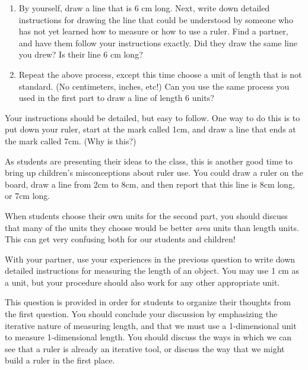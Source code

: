 \documentclass[handout]{ximera}
\begin{document}
\begin{problem}
\hfill
\begin{enumerate}
\item By yourself, draw a line that is 6 cm long.  Next, write down detailed instructions for drawing the line that could be understood by someone who has not yet learned how to measure or how to use a ruler.  Find a partner, and have them follow your instructions exactly.  Did they draw the same line you drew?  Is their line 6 cm long?  
\item Repeat the above process, except this time choose a unit of length that is not standard.  (No centimeters, inches, etc!)  Can you use the same process you used in the first part to draw a line of length 6 units?
\end{enumerate}


\begin{solution}
Your instructions should be detailed, but easy to follow.  One way to do this is to put down your ruler, start at the mark called 1cm, and draw a line that ends at the mark called 7cm.  (Why is this?)
\end{solution}

\begin{instructorNotes}
As students are presenting their ideas to the class, this is another good time to bring up children's misconceptions about ruler use.  You could draw a ruler on the board, draw a line from 2cm to 8cm, and then report that this line is 8cm long, or 7cm long.

When students choose their own units for the second part, you should discuss that many of the units they choose would be better {\em area} units than length units.  This can get very confusing both for our students and children!
\end{instructorNotes}
\end{problem}

\begin{problem}
With your partner, use your experiences in the previous question to write down detailed instructions for measuring the length of an object.  You may use 1 cm as a unit, but your procedure should also work for any other appropriate unit.


\begin{instructorNotes}
This question is provided in order for students to organize their thoughts from the first question.  You should conclude your discussion by emphasizing the iterative nature of measuring length, and that we must use a 1-dimensional unit to measure 1-dimensional length.  You should discuss the ways in which we can see that a ruler is already an iterative tool, or discuss the way that we might build a ruler in the first place.
\end{instructorNotes}
\end{problem}
\end{document}
